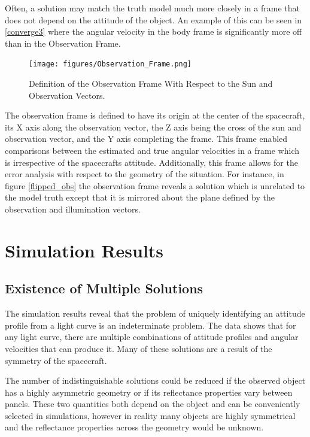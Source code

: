 Often, a solution may match the truth model much more closely in a frame that does not depend on the attitude of the object. An example of this can be seen in \ref{converge3} where the angular velocity in the body frame is significantly more off than in the Observation Frame.

\begin{figure}[ht] 
	\begin{center}
		\texttt{[image: figures/Observation\_Frame.png]}
		\caption{Definition of the Observation Frame With Respect to the Sun and Observation Vectors.}
		\label{body errors}
	\end{center}
\end{figure}

The observation frame is defined to have its origin at the center of the spacecraft, its X axis along the observation vector, the Z axis being the cross of the sun and observation vector, and the Y axis completing the frame. This frame enabled comparisons between the estimated and true angular velocities in a frame which is irrespective of the spacecrafts attitude. Additionally, this frame allows for the error analysis with respect to the geometry of the situation. For instance, in figure \ref{flipped_obs} the observation frame reveals a solution which is unrelated to the model truth except that it is mirrored about the plane defined by the observation and illumination vectors.

\section{Simulation Results}

\subsection{Existence of Multiple Solutions}
The simulation results reveal that the problem of uniquely identifying an attitude profile from a light curve is an indeterminate problem. The data shows that for any light curve, there are multiple combinations of attitude profiles and angular velocities that can produce it. Many of these solutions are a result of the symmetry of the spacecraft. 

The number of indistinguishable solutions could be reduced if the observed object has a highly asymmetric geometry or if its reflectance properties vary between panels. These two quantities both depend on the object and can be conveniently selected in simulations, however in reality many objects are highly symmetrical and the reflectance properties across the geometry would be unknown.


